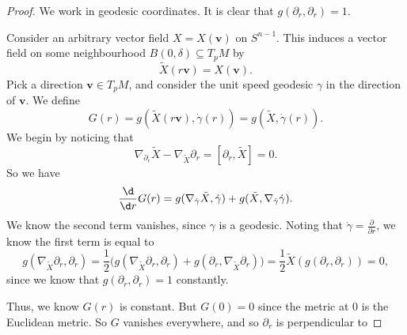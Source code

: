 \documentclass[a4paper]{article}
\begin{document}
\begin{proof}
  We work in geodesic coordinates. It is clear that $g(\partial_r, \partial_r) = 1$.

  Consider an arbitrary vector field $X = X(\mathbf{v})$ on $S^{n - 1}$. This induces a vector field on some neighbourhood $B(0, \delta) \subseteq T_p M$ by
  \[
    \tilde{X}(r\mathbf{v}) = X(\mathbf{v}).
  \]
  Pick a direction $\mathbf{v} \in T_pM$, and consider the unit speed geodesic $\gamma$ in the direction of $\mathbf{v}$. We define
  \[
    G(r) = g(\tilde{X}(r\mathbf{v}), \dot{\gamma}(r)) = g(\tilde{X}, \dot{\gamma}(r)).
  \]
  We begin by noticing that
  \[
    \nabla_{\partial_r} \tilde{X} - \nabla_{\tilde{X}} \partial_r = [\partial_r , \tilde{X}] = 0.
  \]
  So we have
  \[
    \frac{\d}{\d r} G(r) = g(\nabla_{\dot{\gamma}} \tilde{X}, \dot{\gamma}) + g(\tilde{X}, \nabla_{\dot{\gamma}} \dot{\gamma}).
  \]
  We know the second term vanishes, since $\gamma$ is a geodesic. Noting that $\dot{\gamma} = \frac{\partial}{\partial r}$, we know the first term is equal to
  \[
    g(\nabla_{\tilde{X}} \partial_r, \partial_r) = \frac{1}{2} \big(g(\nabla_{\tilde{X}} \partial_r, \partial_r) + g( \partial_r, \nabla_{\tilde{X}}\partial_r)\big) = \frac{1}{2} \tilde{X} (g(\partial_r, \partial_r)) = 0,
  \]
  since we know that $g(\partial_r, \partial_r) = 1$ constantly.

  Thus, we know $G(r)$ is constant. But $G(0) = 0$ since the metric at $0$ is the Euclidean metric. So $G$ vanishes everywhere, and so $\partial_r$ is perpendicular to


\end{proof}
\end{document}
